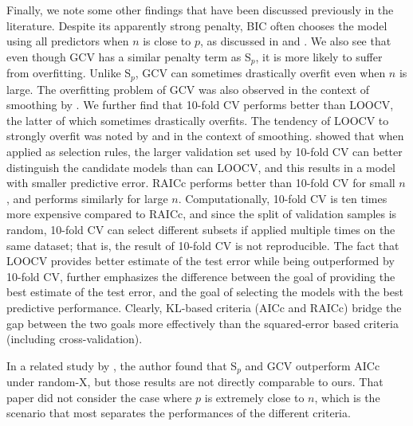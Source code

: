 Finally, we note some other findings that have been discussed previously in the literature. Despite its apparently strong penalty, BIC often chooses the model using all predictors when $n$ is close to $p$, as discussed in \citet{hurvich1989regression} and \citet{baraud2009gaussian}. We also see that even though GCV has a similar penalty term as S$_p$, it is more likely to suffer from overfitting. Unlike S$_p$, GCV can sometimes drastically overfit even when $n$ is large. The overfitting problem of GCV was also observed in the context of smoothing by \citet{hurvich1998smoothing}. We further find that 10-fold CV performs better than LOOCV, the latter of which sometimes drastically overfits. The tendency of LOOCV to strongly overfit was noted by \citet{scott1987biased} and \citet{hall1991local} in the context of smoothing. \citet{zhang2015cross} showed that when applied as selection rules, the larger validation set used by 10-fold CV can better distinguish the candidate models than can LOOCV, and this results in a model with smaller predictive error. RAICc performs better than 10-fold CV for small $n$, and performs similarly for large $n$. Computationally, 10-fold CV is ten times more expensive compared to RAICc, and since the split of validation samples is random, 10-fold CV can select different subsets if applied multiple times on the same dataset; that is, the result of 10-fold CV is not reproducible. The fact that LOOCV provides better estimate of the test error while being outperformed by 10-fold CV, further emphasizes the difference between the goal of providing the best estimate of the test error, and the goal of selecting the models with the best predictive performance. Clearly, KL-based criteria (AICc and RAICc) bridge the gap between the two goals more effectively than the squared-error based criteria (including cross-validation).

In a related study by \citet{leeb2008evaluation}, the author found that S$_p$ and GCV outperform AICc under random-X, but those results are not directly comparable to ours. That paper did not consider the case where $p$ is extremely close to $n$, which is the scenario that most separates the performances of the different criteria. 

